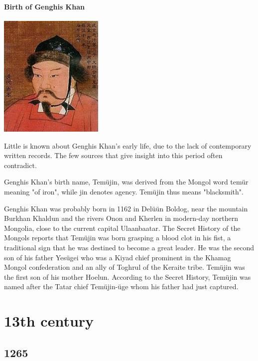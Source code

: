 \documentclass[11pt]{report}
\begin{document}
\subsection{Birth of Genghis Khan}
\vspace{2mm}\begin{center}\includegraphics[width=5cm]{./img/gengishKhan.jpg}\end{center}
Little is known about Genghis Khan's early life, due to the lack of contemporary written records. The few sources that give insight into this period often contradict.

Genghis Khan's birth name, Temüjin, was derived from the Mongol word temür meaning "of iron", while jin denotes agency. Temüjin thus means "blacksmith".

Genghis Khan was probably born in 1162 in Delüün Boldog, near the mountain Burkhan Khaldun and the rivers Onon and Kherlen in modern-day northern Mongolia, close to the current capital Ulaanbaatar. The Secret History of the Mongols reports that Temüjin was born grasping a blood clot in his fist, a traditional sign that he was destined to become a great leader. He was the second son of his father Yesügei who was a Kiyad chief prominent in the Khamag Mongol confederation and an ally of Toghrul of the Keraite tribe. Temüjin was the first son of his mother Hoelun. According to the Secret History, Temüjin was named after the Tatar chief Temüjin-üge whom his father had just captured.


										
	
\part{13th century}
\chapter{1265}
\end{document}

